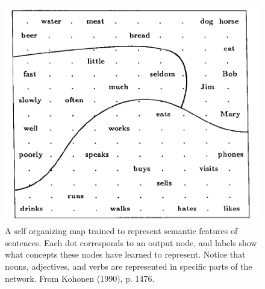 \begin{figure}[h]
\centering
\includegraphics[scale=.5]{./images/SOM_SemanticMap.png}
\caption[From Kohonen, 1998 \cite{kohonen1990self}.]{A self organizing map trained to represent semantic features of sentences. Each dot corresponds to an output node, and labels show what concepts these nodes have learned to represent. Notice that nouns, adjectives, and verbs are represented in specific parts of the network. From Kohonen (1990), p. 1476.}
\label{somSemantic}
\end{figure}
